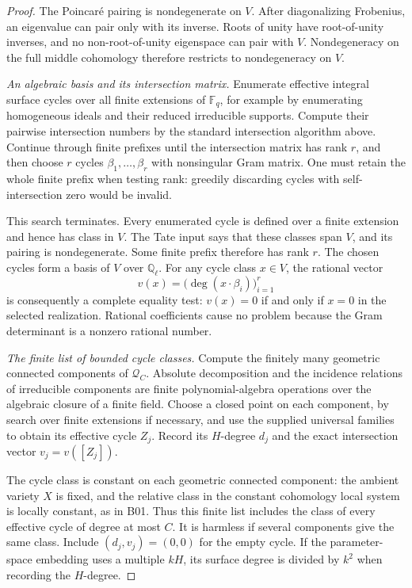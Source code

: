 \begin{proof}
The Poincar\'e pairing is nondegenerate on $V$. After diagonalizing
Frobenius, an eigenvalue can pair only with its inverse. Roots of unity
have root-of-unity inverses, and no non-root-of-unity eigenspace can
pair with $V$. Nondegeneracy on the full middle cohomology therefore
restricts to nondegeneracy on $V$.

\emph{An algebraic basis and its intersection matrix.}
Enumerate effective integral surface cycles over all finite extensions
of $\mathbb F_q$, for example by enumerating homogeneous ideals and
their reduced irreducible supports. Compute their pairwise intersection
numbers by the standard intersection algorithm above. Continue through finite prefixes until
the intersection matrix has rank $r$, and then choose $r$ cycles
$\beta_1,\ldots,\beta_r$ with nonsingular Gram matrix.
One must retain the whole finite prefix when testing rank: greedily
discarding cycles with self-intersection zero would be invalid.

This search terminates. Every enumerated cycle is defined over a finite
extension and hence has class in $V$. The Tate input says that these
classes span $V$, and its pairing is nondegenerate. Some finite prefix
therefore has rank $r$. The chosen cycles form a basis of $V$ over
$\mathbb Q_\ell$. For any cycle class $x\in V$, the rational vector
\[
                   v(x)=\bigl(\deg(x\cdot\beta_i)\bigr)_{i=1}^r
\]
is consequently a complete equality test: $v(x)=0$ if and only if
$x=0$ in the selected realization. Rational coefficients cause no
problem because the Gram determinant is a nonzero rational number.

\emph{The finite list of bounded cycle classes.}
Compute the finitely many geometric connected components of
$\mathcal Q_C$. Absolute decomposition and the incidence relations of
irreducible components are finite polynomial-algebra operations over
the algebraic closure of a finite field. Choose a closed point on each
component, by search over finite extensions if necessary, and use the
supplied universal families to obtain its effective cycle $Z_j$.
Record its $H$-degree $d_j$ and the exact intersection vector
$v_j=v([Z_j])$.

The cycle class is constant on each geometric connected component:
the ambient variety $X$ is fixed, and the relative class in the constant
cohomology local system is locally constant, as in B01. Thus this finite
list includes the class of every effective cycle of degree at most
$C$. It is harmless if several components give the same class. Include
$(d_j,v_j)=(0,0)$ for the empty cycle. If the parameter-space embedding
uses a multiple $kH$, its surface degree is divided by $k^2$ when
recording the $H$-degree.


\end{proof}
